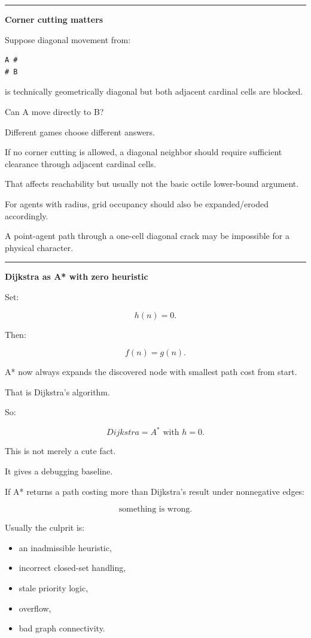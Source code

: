 \begin{center}\rule{0.5\linewidth}{0.5pt}\end{center}

\textbf{Corner cutting matters}

Suppose diagonal movement from:

\begin{verbatim}
A #
# B
\end{verbatim}

is technically geometrically diagonal but both adjacent cardinal cells are blocked.

Can A move directly to B?

Different games choose different answers.

If no corner cutting is allowed, a diagonal neighbor should require sufficient clearance through adjacent cardinal cells.

That affects reachability but usually not the basic octile lower-bound argument.

For agents with radius, grid occupancy should also be expanded/eroded accordingly.

A point-agent path through a one-cell diagonal crack may be impossible for a physical character.

\begin{center}\rule{0.5\linewidth}{0.5pt}\end{center}

\textbf{Dijkstra as A* with zero heuristic}

Set:

\[
h(n)=0.
\]

Then:

\[
f(n)=g(n).
\]

A* now always expands the discovered node with smallest path cost from start.

That is Dijkstra's algorithm.

So:

\[
\boxed{
Dijkstra
=
A^*\text{ with }h=0.
}
\]

This is not merely a cute fact.

It gives a debugging baseline.

If A* returns a path costing more than Dijkstra's result under nonnegative edges:

\[
\text{something is wrong}.
\]

Usually the culprit is:

\begin{itemize}
\tightlist
\item
  an inadmissible heuristic,
\item
  incorrect closed-set handling,
\item
  stale priority logic,
\item
  overflow,
\item
  bad graph connectivity.
\end{itemize}

